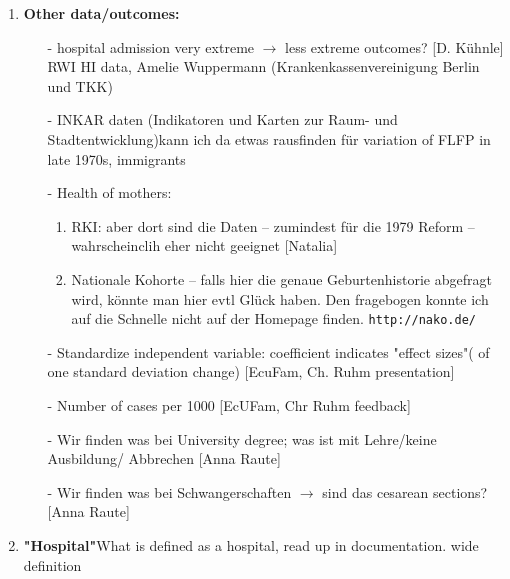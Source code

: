 \documentclass[11pt,a4paper]{article}
\begin{document}
{\begin{enumerate}
\item \textbf{Other data/outcomes:}\vspace{-1 em}
\begin{itemize}
\item[-] hospital admission very extreme $\rightarrow$ less extreme outcomes? [D. Kühnle] RWI HI data, Amelie Wuppermann (Krankenkassenvereinigung Berlin und TKK)
\item[-] INKAR daten (Indikatoren und Karten zur Raum- und Stadtentwicklung)\newline kann ich da etwas rausfinden für variation of FLFP in late 1970s, immigrants 
\item[-] Health of mothers: \vspace{-.5em}
\begin{enumerate}
\item RKI: aber dort sind die Daten – zumindest für die 1979 Reform – wahrscheinclih eher nicht geeignet [Natalia]
\item  Nationale Kohorte – falls hier die genaue Geburtenhistorie abgefragt wird, könnte man hier evtl Glück haben. Den fragebogen konnte ich auf die Schnelle nicht auf der Homepage finden. \texttt{http://nako.de/}
\end{enumerate}
\item[-] Standardize independent variable: coefficient indicates "effect sizes"( of one standard deviation change) [EcuFam, Ch. Ruhm presentation]
\item[-] Number of cases  per 1000 [EcUFam, Chr Ruhm feedback] 
\item[-] Wir finden was bei University degree; was ist mit Lehre/keine Ausbildung/ Abbrechen [Anna Raute]
\item[-] Wir finden was bei Schwangerschaften $\rightarrow$ sind das cesarean sections? [Anna Raute]
\end{itemize}


\item \textbf{"Hospital"}\newline What is defined as a hospital, read up in documentation. wide definition



\end{enumerate}}
\end{document}
